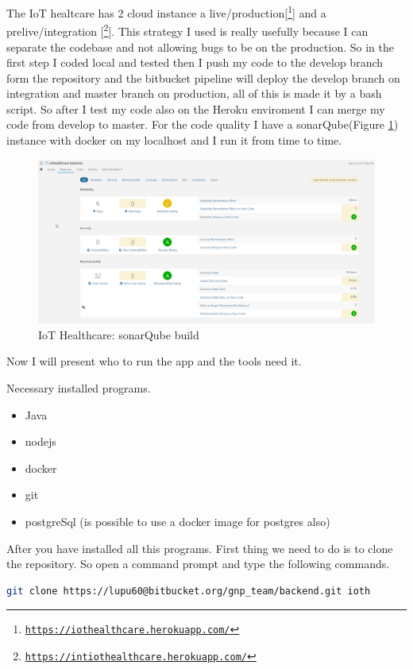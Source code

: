 The IoT healtcare has 2 cloud instance a live/production[\footnote{\href{https://iothealthcare.herokuapp.com/}{\texttt{https://iothealthcare.herokuapp.com/}}}] and a prelive/integration [\footnote{\href{https://intiothealthcare.herokuapp.com/}{\texttt{https://intiothealthcare.herokuapp.com/}}}]. This strategy I used is really usefully because I can separate the codebase and not allowing bugs to be on the production. So in the first step I coded local and tested then I push my code to the develop branch form the repository and the bitbucket pipeline will deploy the develop branch on integration and master branch on production, all of this is made it by a bash script. So after I test my code also on the Heroku enviroment I can merge my code from develop to master.
For the code quality I have a sonarQube(Figure \ref{fig:sonar}) instance with docker on my localhost and I run it from time to time.
\begin{figure}[h]
	\centering
	\includegraphics[width=\linewidth]{images/sonarqube}
	\caption{IoT Healthcare: sonarQube build}
	\label{fig:sonar}
\end{figure}
\newline

Now I will present who to run the app and the tools need it.

Necessary installed programs.
\begin{itemize}
	\item Java
	\item nodejs
	\item docker
	\item git
	\item postgreSql (is possible to use a docker image for postgres also)
\end{itemize}
\vspace{5mm}

After you have installed all this programs. First thing we need to do is to clone the repository. So open a command prompt and type the following commands.
\begin{lstlisting}[language=Bash]
git clone https://lupu60@bitbucket.org/gnp_team/backend.git ioth
\end{lstlisting}
\vspace{5mm}

